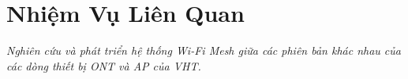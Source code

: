 \chapter{ Nhiệm Vụ Liên Quan}

\emph{Nghiên cứu và phát triển hệ thống Wi-Fi Mesh giữa các phiên bản khác nhau của các dòng thiết bị ONT và AP của VHT.}

